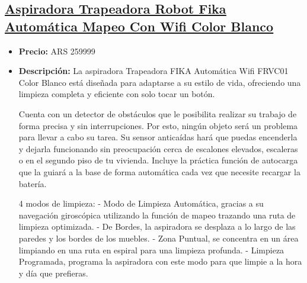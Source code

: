 \documentclass{article}
\begin{document}
\begin{adjustwidth}{2em}{}

\subsection{\uline{\href{https://www.mercadolibre.com.ar/aspiradora-trapeadora-robot-fika-automatica-mapeo-con-wifi-color-blanco/p/MLA29751097}{Aspiradora Trapeadora Robot Fika Automática Mapeo Con Wifi Color Blanco}}}
\begin{itemize}
    \item \textbf{Precio:} ARS 259999
    \item \textbf{Descripción:} La aspiradora Trapeadora FIKA Automática Wifi FRVC01 Color Blanco está diseñada para adaptarse a su estilo de vida, ofreciendo una limpieza completa y eficiente con solo tocar un botón.

Cuenta con un detector de obstáculos que le posibilita realizar su trabajo de forma precisa y sin interrupciones. Por esto, ningún objeto será un problema para llevar a cabo su tarea. 
Su sensor anticaídas hará que puedas encenderla y dejarla funcionando sin preocupación cerca de escalones elevados, escaleras o en el segundo piso de tu vivienda. 
Incluye la práctica función de autocarga que la guiará a la base de forma automática cada vez que necesite recargar la batería.

4 modos de limpieza: 
- Modo de Limpieza Automática, gracias a su navegación giroscópica utilizando la función de mapeo trazando una ruta de limpieza optimizada.
- De Bordes, la aspiradora se desplaza a lo largo de las paredes y los bordes de los muebles. 
- Zona Puntual, se concentra en un área limpiando en una ruta en espiral para una limpieza profunda.
- Limpieza Programada, programa la aspiradora con este modo para que limpie a la hora y día que prefieras. 


\end{itemize}
\end{adjustwidth}
\end{document}
